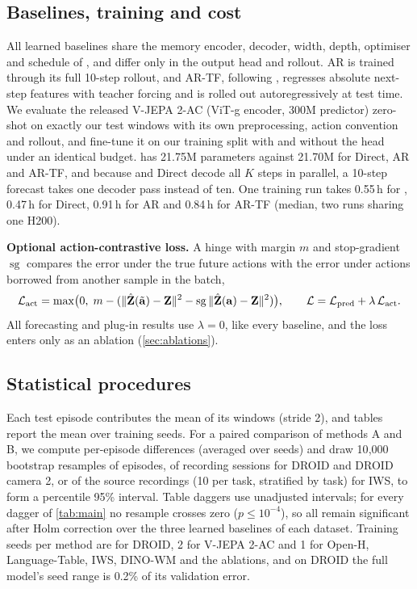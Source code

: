 \subsection{Baselines, training and cost}\label{app:baselines}\label{app:training}
All learned baselines share the memory encoder, decoder, width, depth, optimiser and schedule of \ours{}, and differ
only in the output head and rollout.
%
AR is trained through its full 10-step rollout, and AR-TF, following \citet{zhou2025dinowm}, regresses absolute
next-step features with teacher forcing and is rolled out autoregressively at test time.
%
We evaluate the released V-JEPA 2-AC (ViT-g encoder, 300M predictor) zero-shot on exactly our test windows with its own
preprocessing, action convention and rollout, and fine-tune it on our training split with and without the head under an
identical budget.
%
\ours{} has 21.75M parameters against 21.70M for Direct, AR and AR-TF, and because \ours{} and Direct decode all $K$
steps in parallel, a 10-step forecast takes one decoder pass instead of ten.
%
One training run takes 0.55\,h for \ours{}, 0.47\,h for Direct, 0.91\,h for AR and 0.84\,h for AR-TF (median, two runs
sharing one H200).

\textbf{Optional action-contrastive loss.} A hinge with margin $m$ and stop-gradient $\operatorname{sg}$ compares the
error under the true future actions with the error under actions borrowed from another sample in the batch,
\begin{equation}
  \mathcal{L}_{\text{act}} = \max\!\big(0,\; m - (\|\hat{\mathbf{Z}}(\tilde{\mathbf a})-\mathbf{Z}\|^2 - \operatorname{sg}\|\hat{\mathbf{Z}}(\mathbf a)-\mathbf{Z}\|^2)\big),
  \qquad \mathcal{L}=\mathcal{L}_{\text{pred}}+\lambda\,\mathcal{L}_{\text{act}} .
  \label{eq:contrastive}
\end{equation}
All forecasting and plug-in results use $\lambda{=}0$, like every baseline, and the loss enters only as an
ablation (\cref{sec:ablations}).

\subsection{Statistical procedures}\label{app:stats}
Each test episode contributes the mean of its windows (stride 2), and tables report the mean over training seeds.
%
For a paired comparison of methods A and B, we compute per-episode differences (averaged over seeds) and draw 10{,}000
bootstrap resamples of episodes, of recording sessions for DROID and DROID camera 2, or of the source recordings (10 per task, stratified by task) for IWS, to form a percentile 95\% interval.
%
Table daggers use unadjusted intervals; for every dagger of \cref{tab:main} no resample crosses zero ($p\le10^{-4}$),
so all remain significant after Holm correction over the three learned baselines of each dataset.
%
Training seeds per method are \droidSeeds{} for DROID, 2 for V-JEPA 2-AC and 1 for Open-H, Language-Table, IWS,
DINO-WM and the ablations, and on DROID the full model's seed range is 0.2\% of its validation error.

